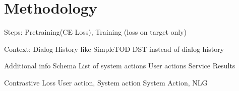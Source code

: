 \section{Methodology}

Steps: Pretraining(CE Loss), Training (loss on target only)

Context: 
Dialog History like SimpleTOD
DST instead of dialog history

Additional info
Schema
List of system actions
User actions
Service Results

Contrastive Loss
User action, System action
System Action, NLG



